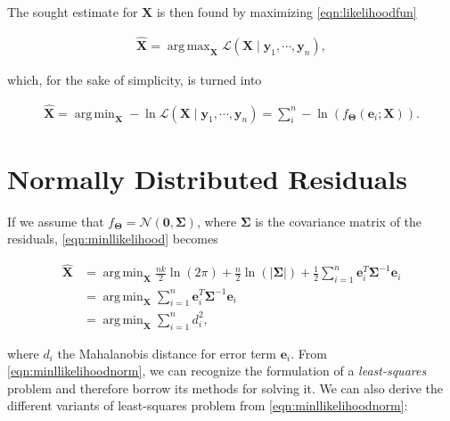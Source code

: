 \documentclass[12pt]{article}
\DeclareMathOperator*{\argmax}{arg\,max}
\DeclareMathOperator*{\argmin}{arg\,min}
\begin{document}
  \noindent The sought estimate for $\mathbf{X}$ is then found by maximizing
  \eqref{eqn:likelihoodfun}

  \begin{equation}\label{eqn:maxlikelihood}
    \begin{aligned}
      \mathbf{\hat{X}} = \argmax_{\mathbf{X}}\mathcal{L}(\mathbf{X}
        \mid \mathbf{y}_1,\cdots,\mathbf{y}_n),
    \end{aligned}
  \end{equation}

  \noindent which, for the sake of simplicity, is turned into

  \begin{equation}\label{eqn:minllikelihood}
    \begin{aligned}
      \mathbf{\hat{X}} =
        \argmin_{\mathbf{X}}-\ln\mathcal{L}(\mathbf{X}\mid
        \mathbf{y}_1,\cdots,\mathbf{y}_n)=
        \sum_i^n -\ln(f_{\boldsymbol{\Theta}}(\mathbf{e}_i;\mathbf{X})).
    \end{aligned}
  \end{equation}

  \section{Normally Distributed Residuals}

  If we assume that
  $f_{\boldsymbol{\Theta}}=\mathcal{N}(\mathbf{0},\boldsymbol{\Sigma})$,
  where $\boldsymbol{\Sigma}$ is the covariance matrix of the residuals,
  \eqref{eqn:minllikelihood} becomes

  \begin{equation}\label{eqn:minllikelihoodnorm}
    \begin{aligned}
      \mathbf{\hat{X}} &=
        \argmin_{\mathbf{X}}\frac{n k}{2}\ln(2\pi)+
          \frac{n}{2}\ln(|\boldsymbol{\Sigma}|)+\frac{1}{2}
          \sum_{i=1}^n\mathbf{e}_i^T\boldsymbol{\Sigma}^{-1}\mathbf{e}_i
          \\&=\argmin_{\mathbf{X}}
          \sum_{i=1}^n\mathbf{e}_i^T\boldsymbol{\Sigma}^{-1}\mathbf{e}_i
          \\&=\argmin_{\mathbf{X}}
          \sum_{i=1}^n d_i^2,
    \end{aligned}
  \end{equation}

  \noindent where $d_i$ the Mahalanobis distance for error term $\mathbf{e}_i$.
  From \eqref{eqn:minllikelihoodnorm}, we can recognize the formulation of a
  \emph{least-squares} problem and therefore borrow its methods for solving it.
  We can also derive the different variants of least-squares problem from
  \eqref{eqn:minllikelihoodnorm}:
\end{document}
